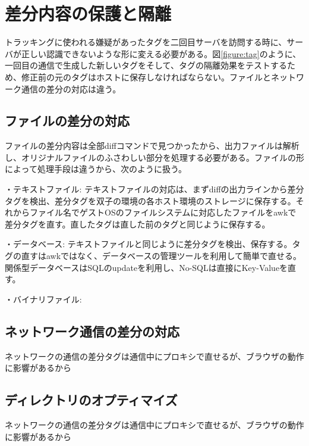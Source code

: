 \documentclass[a4paper,twocolumn,10pt]{jarticle}
\begin{document}
\section{差分内容の保護と隔離}

トラッキングに使われる嫌疑があったタグを二回目サーバを訪問する時に、サーバが正しい認識できないような形に変える必要がある。図\ref{figure:tag}のように、一回目の通信で生成した新しいタグをそして、タグの隔離効果をテストするため、修正前の元のタグはホストに保存しなければならない。ファイルとネットワーク通信の差分の対応は違う。

\subsection{ファイルの差分の対応}
ファイルの差分内容は全部diffコマンドで見つかったから、出力ファイルは解析し、オリジナルファイルのふさわしい部分を処理する必要がある。ファイルの形によって処理手段は違うから、次のように扱う。

\begin{description}
\item{・テキストファイル: }
テキストファイルの対応は、まずdiffの出力ラインから差分タグを検出、差分タグを双子の環境の各ホスト環境のストレージに保存する。それからファイル名でゲストOSのファイルシステムに対応したファイルをawkで差分タグを直す。直したタグは直した前のタグと同じように保存する。
\item{・データベース: }
テキストファイルと同じように差分タグを検出、保存する。タグの直すはawkではなく、データベースの管理ツールを利用して簡単で直せる。関係型データベースはSQLのupdateを利用し、No-SQLは直接にKey-Valueを直す。
\item{・バイナリファイル: }

\end{description}
\subsection{ネットワーク通信の差分の対応}
ネットワークの通信の差分タグは通信中にプロキシで直せるが、ブラウザの動作に影響があるから
\subsection{ディレクトリのオプティマイズ}
ネットワークの通信の差分タグは通信中にプロキシで直せるが、ブラウザの動作に影響があるから







 
 
\end{document}
